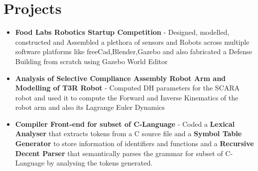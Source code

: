 \documentclass{article}
\begin{document}
\section*{Projects}
\begin{itemize}

    \item{\textbf{\large{Food Labs Robotics Startup Competition}}}
          \newline
          \textmd{- Designed, modelled, constructed and
              Assembled a plethora of sensors and Robots across multiple software platforms like
              freeCad,Blender,Gazebo and also fabricated a Defense Building from scratch using Gazebo World Editor}
    \item{\textbf{\large{Analysis of Selective Compliance Assembly Robot Arm and Modelling of T3R Robot}}}
          \newline
          \textmd{- Computed DH parameters for the SCARA robot and used it to compute the Forward and Inverse Kinematics of the robot arm and also its Lagrange Euler Dynamics}
    \item{\textbf{\large{Compiler Front-end for subset of C-Language}}}
          \newline
          \textmd{- Coded a \textbf{Lexical Analyser} that extracts tokens from a C source file and a \textbf{Symbol Table Generator} to store information of identifiers and functions and a \textbf{Recursive Decent Parser} that semantically parses the grammar for subset of C-Language by analysing the tokens generated.}
\end{itemize}
\end{document}
